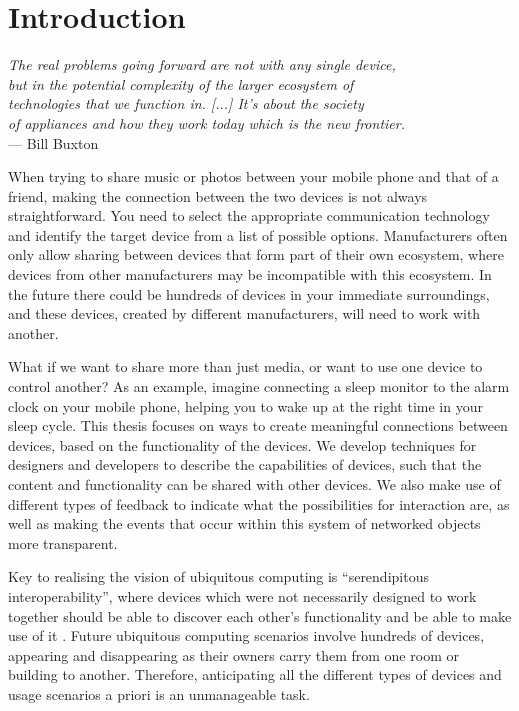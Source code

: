 \chapter{Introduction}
\label{Introduction}

\begin{flushright}{\slshape    
The real problems going forward are not with any single device, \\
but in the potential complexity of the larger ecosystem of \\
technologies that we function in. [...] It's about the society \\
of appliances and how they work today which is the new frontier.} \\ \medskip
    --- Bill Buxton \cite{Buxton2010}
\end{flushright}


When trying to share music or photos between your mobile phone and that of a friend, making the connection between the two devices is not always straightforward. You need to select the appropriate communication technology and identify the target device from a list of possible options. Manufacturers often only allow sharing between devices that form part of their own ecosystem, where devices from other manufacturers may be incompatible with this ecosystem. In the future there could be hundreds of devices in your immediate surroundings, and these devices, created by different manufacturers, will need to work with another.

What if we want to share more than just media, or want to use one device to control another? As an example, imagine connecting a sleep monitor to the alarm clock on your mobile phone, helping you to wake up at the right time in your sleep cycle. This thesis focuses on ways to create meaningful connections between devices, based on the functionality of the devices. We develop techniques for designers and developers to describe the capabilities of devices, such that the content and functionality can be shared with other devices. We also make use of different types of feedback to indicate what the possibilities for interaction are, as well as making the events that occur within this system of networked objects more transparent.

Key to realising the vision of ubiquitous computing \cite{Weiser1991} is ``serendipitous interoperability'', where devices which were not necessarily designed to work together should be able to discover each other's functionality and be able to make use of it \cite{Owl2004}. Future ubiquitous computing scenarios involve hundreds of devices, appearing and disappearing as their owners carry them from one room or building to another. Therefore, anticipating all the different types of devices and usage scenarios a priori is an unmanageable task. 

